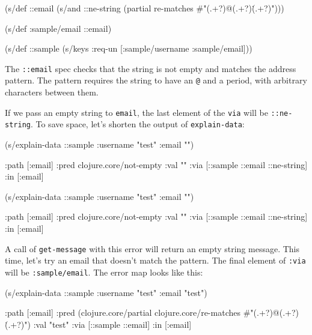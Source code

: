 \else

\begin{english}
  \begin{clojure}
(s/def ::email
  (s/and
   ::ne-string
   (partial re-matches #"(.+?)@(.+?)\.(.+?)")))

(s/def :sample/email ::email)

(s/def ::sample
  (s/keys :req-un [:sample/username
                   :sample/email]))
  \end{clojure}
\end{english}

\fi

The \verb|::email| spec checks that the string is not empty and matches the address pattern. The pattern requires the string to have an \verb|@| and a period, with arbitrary characters between them.

If we pass an empty string to \verb|email|, the last element of the \verb|via| will be \verb|::ne-string|. To save space, let's shorten the output of \verb|explain-data|:

\ifx\DEVICETYPE\MOBILE

\begin{english}
  \begin{clojure}
(s/explain-data ::sample
  {:username "test" :email ""})

{:path [:email]
 :pred clojure.core/not-empty
 :val ""
 :via [::sample ::email ::ne-string]
 :in [:email]}
  \end{clojure}
\end{english}

\else

\begin{english}
  \begin{clojure}
(s/explain-data ::sample {:username "test" :email ""})

{:path [:email]
 :pred clojure.core/not-empty
 :val ""
 :via [::sample ::email ::ne-string]
 :in [:email]}
  \end{clojure}
\end{english}

\fi

A call of \verb|get-message| with this error will return an empty string message. This time, let's try an email that doesn't match the pattern. The final element of \verb|:via| will be \verb|:sample/email|. The error map looks like this:

\ifx\DEVICETYPE\MOBILE

\begin{english}
  \begin{clojure}
(s/explain-data ::sample
  {:username "test" :email "test"})

{:path [:email]
 :pred
 (clojure.core/partial
  clojure.core/re-matches
  #"(.+?)@(.+?)\.(.+?)")
 :val "test"
 :via [::sample ::email]
 :in [:email]}
  \end{clojure}
\end{english}

